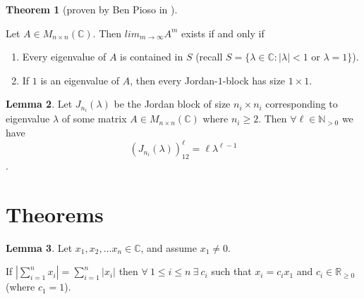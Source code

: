 \documentclass{amsart}
\theoremstyle{definition}
\newtheorem{theorem}{Theorem}
\newtheorem{lemma}[theorem]{Lemma}
\theoremstyle{remark}
\numberwithin{equation}{section}
\begin{document}
\begin{theorem}[proven by Ben Pioso in \cite{benspaper}]\label{benstheorem1}

Let $A \in M_{n \times n}(\mathbb{C})$.
Then $lim_{m \to \infty}A^m$ exists if and only if

    \begin{enumerate}
        \item Every eigenvalue of $A$ is contained in $S$ (recall $S = \{ \lambda \in \mathbb{C}: |\lambda| < 1$ or $\lambda = 1\}$).

        \item If $1$ is an eigenvalue of $A$, then every Jordan-$1$-block has size $1 \times 1$.


    \end{enumerate}


\end{theorem}


\begin{lemma}\label{jordanblockexp}
Let $J_{n_i}(\lambda)$ be the Jordan block of size $n_i \times n_i$ corresponding to eigenvalue $\lambda$ of some matrix $A \in M_{n \times n}(\mathbb{C})$ where $n_i \geq 2$.
Then  $\forall \ell \in \mathbb{N}_{> 0}$ we have
$$(J_{n_i}(\lambda))^{\ell}_{12} = \ell \lambda^{\ell -1}$$.

\end{lemma}



\section{Theorems}


\begin{lemma}\label{section615b}
Let $x_1, x_2, \ldots x_n \in \mathbb{C}$, and assume $x_1 \neq 0$.

If $|\sum_{i = 1}^n x_i| = \sum_{i = 1}^{n}| x_i|$ then $\forall\ 1
\leq i \leq n\ \exists\ c_i$ such that $x_i = c_ix_1$ and $c_i \in
\mathbb{R}_{\geq 0}$ (where $c_1 = 1$).

\end{lemma}
\end{document}

